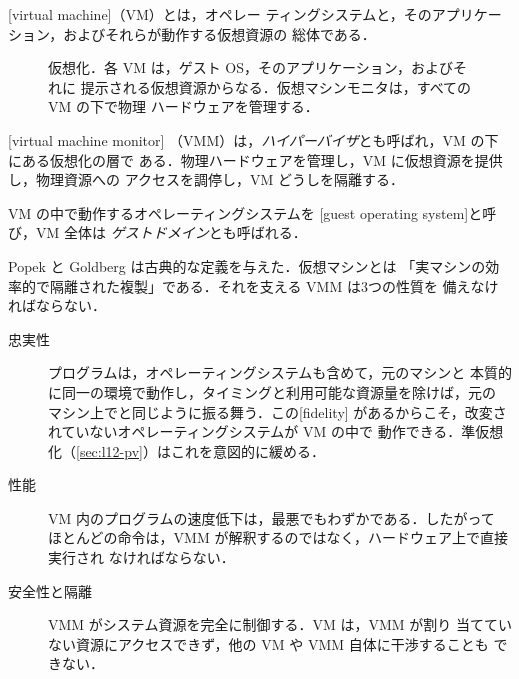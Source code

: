 \documentclass[../main.tex]{subfiles}
\begin{document}
\begin{definition}[仮想マシン]
  [virtual machine]（VM）とは，オペレー
  ティングシステムと，そのアプリケーション，およびそれらが動作する仮想資源の
  総体である．
\end{definition}

\begin{figure}[htbp]
  \centering
  
  \caption{仮想化．各 VM は，ゲスト OS，そのアプリケーション，およびそれに
    提示される仮想資源からなる．仮想マシンモニタは，すべての VM の下で物理
    ハードウェアを管理する．}
  \label{fig:l12-vmm}
\end{figure}

\begin{definition}[仮想マシンモニタ]
  [virtual machine monitor]
  （VMM）は，\emph{ハイパーバイザ}とも呼ばれ，VM の下にある仮想化の層で
  ある．物理ハードウェアを管理し，VM に仮想資源を提供し，物理資源への
  アクセスを調停し，VM どうしを隔離する．
\end{definition}
%

VM の中で動作するオペレーティングシステムを
[guest operating system]と呼び，VM 全体は
\emph{ゲストドメイン}とも呼ばれる．

Popek と Goldberg \cite{popek1974} は古典的な定義を与えた．仮想マシンとは
「実マシンの効率的で隔離された複製」である．それを支える VMM は3つの性質を
備えなければならない．%
\begin{description}
  \item[忠実性] プログラムは，オペレーティングシステムも含めて，元のマシンと
    本質的に同一の環境で動作し，タイミングと利用可能な資源量を除けば，元の
    マシン上でと同じように振る舞う．この[fidelity]%
    があるからこそ，改変されていないオペレーティングシステムが VM の中で
    動作できる．準仮想化（\cref{sec:l12-pv}）はこれを意図的に緩める．
  \item[性能] VM 内のプログラムの速度低下は，最悪でもわずかである．したがって
    ほとんどの命令は，VMM が解釈するのではなく，ハードウェア上で直接実行され
    なければならない．
  \item[安全性と隔離] VMM がシステム資源を完全に制御する．VM は，VMM が割り
    当てていない資源にアクセスできず，他の VM や VMM 自体に干渉することも
    できない．
\end{description}
\end{document}
